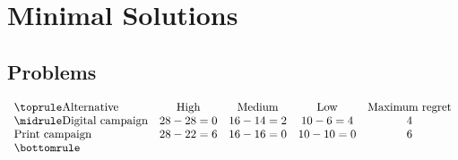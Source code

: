 \section{Minimal Solutions}

\subsection*{Problems}
\[\begin{array}{lcccc}
			\toprule
			\text{Alternative} & \text{High} & \text{Medium} & \text{Low} & \text{Maximum regret}\\
			\midrule
			\text{Digital campaign} & 28-28=0 & 16-14=2 & 10-6=4 & 4\\
			\text{Print campaign} & 28-22=6 & 16-16=0 & 10-10=0 & 6\\
			\bottomrule
		\end{array}\]


